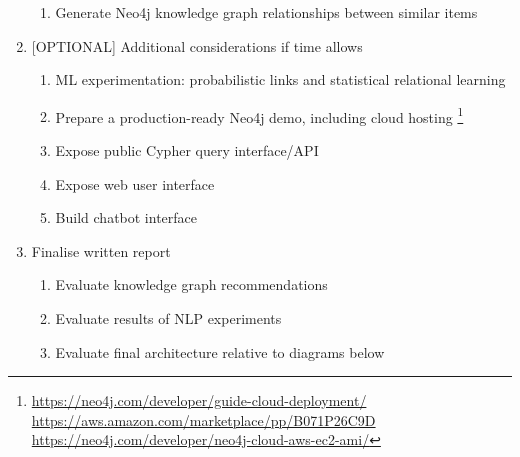 \documentclass[11pt]{article}   	%
\begin{document}
\begin{enumerate}
\begin{enumerate}
  \item Generate Neo4j knowledge graph relationships between similar items
  \end{enumerate}
\item{[OPTIONAL] Additional considerations if time allows} \label{sec:PropOptional}
  \begin{enumerate}
  \item ML experimentation: probabilistic links and statistical relational learning\cite{nickel2015review}
  \item Prepare a production-ready Neo4j demo, including cloud hosting
  \footnote{\url{https://neo4j.com/developer/guide-cloud-deployment/} \\ \url{https://aws.amazon.com/marketplace/pp/B071P26C9D} \\ \url{https://neo4j.com/developer/neo4j-cloud-aws-ec2-ami/} }
  \item Expose public Cypher query interface/API
  \item Expose web user interface
  \item Build chatbot interface
  \end{enumerate}
\item Finalise written report \label{sec:PropWrittenReport}
  \begin{enumerate}
  \item Evaluate knowledge graph recommendations
  \item Evaluate results of NLP experiments
  \item Evaluate final architecture relative to diagrams below
  \end{enumerate}
\end{enumerate}
\end{document}
